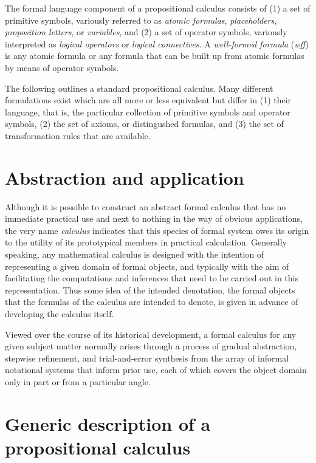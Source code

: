 \documentclass[12pt]{article}
\begin{document}
The formal language component of a propositional calculus consists of (1) a set of primitive symbols, variously referred to as \textit{atomic formulas}, \textit{placeholders}, \textit{proposition letters}, or \textit{variables}, and (2) a set of operator symbols, variously interpreted as \textit{logical operators} or \textit{logical connectives}.  A \textit{well-formed formula} (\textit{wff}) is any atomic formula or any formula that can be built up from atomic formulas by means of operator symbols.

The following outlines a standard propositional calculus.  Many different formulations exist which are all more or less equivalent but differ in (1) their language, that is, the particular collection of primitive symbols and operator symbols, (2) the set of axioms, or distingushed formulas, and (3) the set of transformation rules that are available.

\tableofcontents

\section{Abstraction and application}

Although it is possible to construct an abstract formal calculus that has no immediate practical use and next to nothing in the way of obvious applications, the very name \textit{calculus} indicates that this species of formal system owes its origin to the utility of its prototypical members in practical calculation.  Generally speaking, any mathematical calculus is designed with the intention of representing a given domain of formal objects, and typically with the aim of facilitating the computations and inferences that need to be carried out in this representation.  Thus some idea of the intended denotation, the formal objects that the formulas of the calculus are intended to denote, is given in advance of developing the calculus itself.

Viewed over the course of its historical development, a formal calculus for any given subject matter normally arises through a process of gradual abstraction, stepwise refinement, and trial-and-error synthesis from the array of informal notational systems that inform prior use, each of which covers the object domain only in part or from a particular angle.

\section{Generic description of a propositional calculus}
\end{document}
